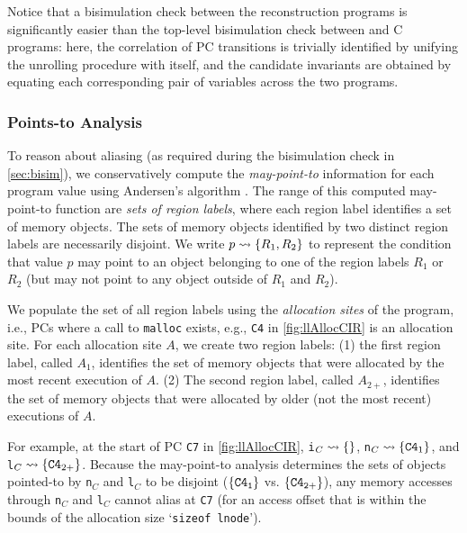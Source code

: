 Notice that a bisimulation check
between the reconstruction programs is significantly
easier than the top-level bisimulation check between \SpecL{}
and C programs: here,
the correlation of PC transitions is trivially
identified by unifying the unrolling procedure with itself, and
the candidate invariants
are obtained by equating each corresponding pair
of variables across
the two programs.

\subsubsection{Points-to Analysis}
\label{sec:pointsTo}
To reason about aliasing (as required during the bisimulation
check in \cref{sec:bisim}), we conservatively compute the
{\em may-point-to}
information for each program value using Andersen's algorithm \cite{andersen94programanalysis}.
The range of this computed
may-point-to function are {\em sets of region labels}, where
each region label identifies a set of memory objects.
The sets of memory objects identified by two distinct region
labels are necessarily disjoint. We write $p\rightsquigarrow\{R_1,R_2\}$
to represent the condition that value $p$ may point to
an object belonging to one of the region labels $R_1$ or $R_2$ (but
may not point to any object outside of $R_1$ and $R_2$).

We populate the set of all region labels using the
{\em allocation
sites} of the program, i.e., PCs where a call to
{\tt malloc} exists, e.g., {\tt C4}
in \cref{fig:llAllocCIR} is an allocation site.
For each allocation site $A$, we create
two region labels: (1) the first region label, called $A_1$,
identifies the set of memory
objects that were allocated by the most recent execution of $A$. (2) The second
region label, called $A_{2+}$, identifies
the set of memory objects that were allocated by older (not the most
recent) executions of $A$.

For example, at the start of PC {\tt C7} in \cref{fig:llAllocCIR},
{\tt i}$_C\rightsquigarrow{}\{\}$,
{\tt n}$_C\rightsquigarrow{}\{{\tt C4}_1\}$,
and {\tt l}$_C\rightsquigarrow{}\{{\tt C4}_{2+}\}$.
Because the may-point-to analysis determines the
sets of objects pointed-to by {\tt n}$_C$ and {\tt l}$_C$ to
be disjoint ($\{{\tt C4_{1}}\}$ vs. $\{{\tt C4_{2+}}\}$), any
memory accesses through {\tt n}$_C$ and {\tt l}$_C$
cannot alias at {\tt C7} (for an access
offset that is within the bounds of
the allocation size `{\tt sizeof lnode}').

